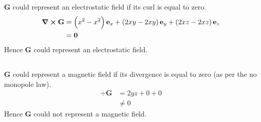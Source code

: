 \subsection{}
$ \mathbf{G} $ could represent an electrostatic field if its curl is equal to zero.
\begin{align*}
    \curl{\mathbf{G}} & = \del{x^2 - x^2}\mathbf{e}_x + \del{2xy - 2xy}\mathbf{e}_y + \del{2xz - 2xz}\mathbf{e}_z\\
    & = \mathbf{0}
\end{align*}
Hence $ \mathbf{G} $ could represent an electrostatic field.

\subsection{}
$ \mathbf{G} $ could represent a magnetic field if its divergence is equal to zero (as per the no monopole law).
\begin{align*}
    \div{\mathbf{G}} & = 2yz + 0 + 0\\
    & \neq 0
\end{align*}
Hence $ \mathbf{G} $ could not represent a magnetic field.
